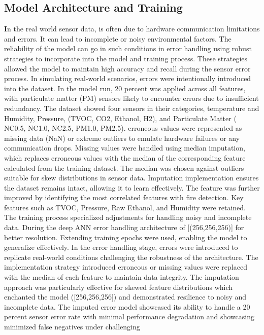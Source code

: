 \documentclass[conference]{IEEEtran}
\begin{document}
\subsection{Model Architecture and Training}

\textbf 
In the real world sensor data, is often due to hardware
communication limitations and errors. It can lead to
incomplete or noisy environmental factors. The reliability
of the model can go in such conditions in error handling
using robust strategies to incorporate into the model and
training process. These strategies allowed the model to
maintain high accuracy and recall during the sensor error
process. In simulating real-world scenarios, errors were
intentionally introduced into the dataset. In the model run,
20 percent was applied across all features, with particulate
matter (PM) sensors likely to encounter errors due to
insufficient redundancy. The dataset showed four sensors in
their categories, temperature and Humidity, Pressure, (TVOC,
CO2, Ethanol, H2), and Particulate Matter ( NC0.5, NC1.0,
NC2.5, PM1.0, PM2.5). erroneous values were represented as
missing data (NaN) or extreme outliers to emulate hardware
failures or any communication drops. Missing values were
handled using median imputation, which replaces erroneous
values with the median of the corresponding feature
calculated from the training dataset. The median was chosen
against outliers suitable for skew distributions in sensor
data. Imputation implementation ensures the dataset remains
intact, allowing it to learn effectively. The feature was
further improved by identifying the most correlated features
with fire detection. Key features such as TVOC, Pressure,
Raw Ethanol, and Humidity were retained.    
The training process specialized adjustments for handling
noisy and incomplete data. During the deep ANN error
handling architecture of [(256,256,256)] for better
resolution. Extending training epochs were used, enabling
the model to generalize effectively. In the error handling
stage, errors were introduced to replicate real-world
conditions challenging the robustness of the architecture.
The implementation strategy introduced erroneous or missing
values were replaced with the median of each feature to
maintain data integrity. The imputation approach was
particularly effective for skewed feature distributions
which enchanted the model ([256,256,256]) and demonstrated
resilience to noisy and incomplete data. The imputed error
model showcased its ability to handle a 20 percent sensor
error rate with minimal performance degradation and
showcasing minimized false negatives under challenging
\end{document}
